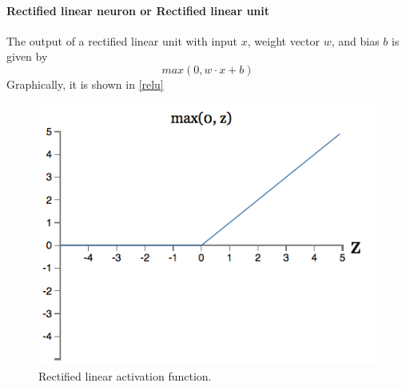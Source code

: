 \documentclass[12pt, letterpaper]{article}
\theoremstyle{definition}
\let\tb\textbf
\begin{document}
\paragraph{\tb{Rectified linear neuron} or {Rectified linear unit}} The output of a rectified linear unit with input $x$, weight vector $w$, and bias $b$ is given by
\begin{equation}
max(0, w\cdot x+b)
\end{equation}
Graphically, it is shown in \autoref{relu}
\begin{figure}
\centering
\includegraphics[scale=0.6]{img/relu}
\caption{Rectified linear activation function.}
\label{relu}
\end{figure}
\end{document}
